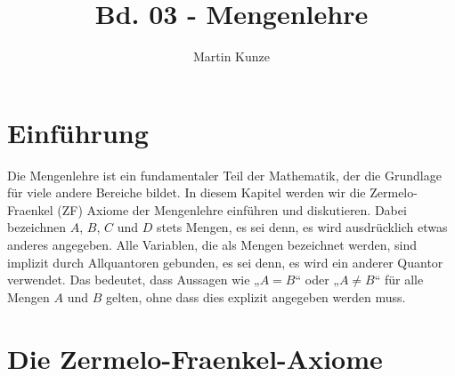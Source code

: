 \documentclass[main.tex]{subfiles}
\title{Bd. 03 - Mengenlehre}
\author{Martin Kunze}
\date{}
\begin{document}
\maketitle
\tableofcontents



\chapter{Einführung}

Die Mengenlehre ist ein fundamentaler Teil der Mathematik, der die Grundlage für viele andere Bereiche bildet. In diesem Kapitel werden wir die Zermelo-Fraenkel (ZF) Axiome der Mengenlehre einführen und diskutieren. Dabei bezeichnen \( A \), \( B \), \( C \) und \( D \) stets Mengen, es sei denn, es wird ausdrücklich etwas anderes angegeben. Alle Variablen, die als Mengen bezeichnet werden, sind implizit durch Allquantoren gebunden, es sei denn, es wird ein anderer Quantor verwendet. Das bedeutet, dass Aussagen wie „\( A = B \)“ oder „\( A \neq B \)“ für alle Mengen \( A \) und \( B \) gelten, ohne dass dies explizit angegeben werden muss.

\chapter{Die Zermelo-Fraenkel-Axiome}
\end{document}
